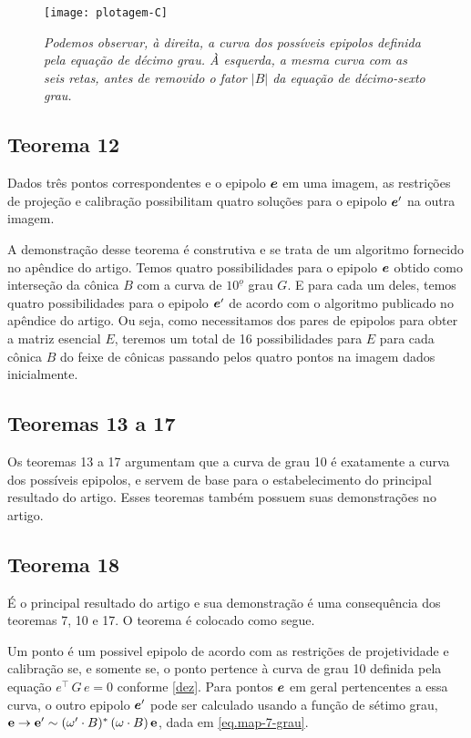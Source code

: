 \begin{figure}[!htb]
\centering
\texttt{[image: plotagem-C]}
\caption{\textit{Podemos observar, à direita, a curva dos possíveis epipolos definida pela equação de décimo grau. À esquerda, a mesma curva com as seis retas, antes de removido o fator $|B|$ da equação de décimo-sexto grau.}}
\label{plot-C}
\end{figure}

\subsection{Teorema 12}
\begin{teorema}
Dados três pontos correspondentes e o epipolo $\boldsymbol{e}$
em uma imagem, as restrições de projeção e calibração possibilitam quatro soluções para o epipolo $\boldsymbol{e}'$ na outra imagem.
\end{teorema}
A demonstração desse teorema é construtiva e se trata de um algoritmo fornecido no apêndice do artigo. Temos quatro possibilidades para o epipolo $\boldsymbol{e}$ obtido como interseção da cônica $B$ com a curva de $10^{\underline{o}}$ grau $G$. E para cada um deles, temos quatro possibilidades para o epipolo $\boldsymbol{e}'$ de acordo com o algoritmo publicado no apêndice do artigo. Ou seja, como necessitamos dos pares de epipolos para obter a matriz esencial $E$, teremos um total de 16 possibilidades para $E$ para cada cônica $B$ do feixe de cônicas passando pelos quatro pontos na imagem dados inicialmente. 


\subsection{Teoremas 13 a 17}
Os teoremas 13 a 17 argumentam que a curva de grau 10 é exatamente a curva dos possíveis epipolos, e servem de base para o estabelecimento do principal resultado do artigo. Esses teoremas também possuem suas demonstrações no artigo.  

\subsection{Teorema 18}
É o principal resultado do artigo e sua demonstração é uma consequência dos teoremas 7, 10 e 17. O teorema é colocado como segue.

\begin{teorema}
Um ponto é um possivel epipolo de acordo com as restrições de projetividade e calibração se, e somente se, o ponto pertence à curva de grau 10 definida pela equação $e^\top\,G\,e=0$ conforme \ref{dez}. Para pontos $\boldsymbol{e}$ em geral pertencentes a essa curva, o outro epipolo $\boldsymbol{e}'$ pode ser calculado usando a função de sétimo grau, ${\bf e} \rightarrow {\bf e'} \sim (\omega' \cdot B)^*\,(\omega \cdot B)\,{\bf e}
$, dada em \ref{eq.map-7-grau}.
\end{teorema}

